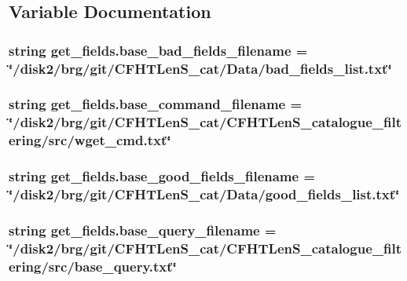 \subsection{Variable Documentation}
\hypertarget{namespaceget__fields_a871b69f17f4070904d2d3de401f38661}{
\subsubsection[{base\-\_\-bad\-\_\-fields\-\_\-filename}]{\setlength{\rightskip}{0pt plus 5cm}string get\-\_\-fields.\-base\-\_\-bad\-\_\-fields\-\_\-filename = \char`\"{}/disk2/brg/git/C\-F\-H\-T\-Len\-S\-\_\-cat/Data/bad\-\_\-fields\-\_\-list.\-txt\char`\"{}}}\label{namespaceget__fields_a871b69f17f4070904d2d3de401f38661}
\hypertarget{namespaceget__fields_ad7c6e2d33547d159fcf394b223c33818}{
\subsubsection[{base\-\_\-command\-\_\-filename}]{\setlength{\rightskip}{0pt plus 5cm}string get\-\_\-fields.\-base\-\_\-command\-\_\-filename = \char`\"{}/disk2/brg/git/C\-F\-H\-T\-Len\-S\-\_\-cat/C\-F\-H\-T\-Len\-S\-\_\-catalogue\-\_\-filtering/src/wget\-\_\-cmd.\-txt\char`\"{}}}\label{namespaceget__fields_ad7c6e2d33547d159fcf394b223c33818}
\hypertarget{namespaceget__fields_a5413e2f327709f8e208c1dab85df5d0e}{
\subsubsection[{base\-\_\-good\-\_\-fields\-\_\-filename}]{\setlength{\rightskip}{0pt plus 5cm}string get\-\_\-fields.\-base\-\_\-good\-\_\-fields\-\_\-filename = \char`\"{}/disk2/brg/git/C\-F\-H\-T\-Len\-S\-\_\-cat/Data/good\-\_\-fields\-\_\-list.\-txt\char`\"{}}}\label{namespaceget__fields_a5413e2f327709f8e208c1dab85df5d0e}
\hypertarget{namespaceget__fields_a9587d8f9ee4720e9bb81860a640ac39b}{
\subsubsection[{base\-\_\-query\-\_\-filename}]{\setlength{\rightskip}{0pt plus 5cm}string get\-\_\-fields.\-base\-\_\-query\-\_\-filename = \char`\"{}/disk2/brg/git/C\-F\-H\-T\-Len\-S\-\_\-cat/C\-F\-H\-T\-Len\-S\-\_\-catalogue\-\_\-filtering/src/base\-\_\-query.\-txt\char`\"{}}}\label{namespaceget__fields_a9587d8f9ee4720e9bb81860a640ac39b}
